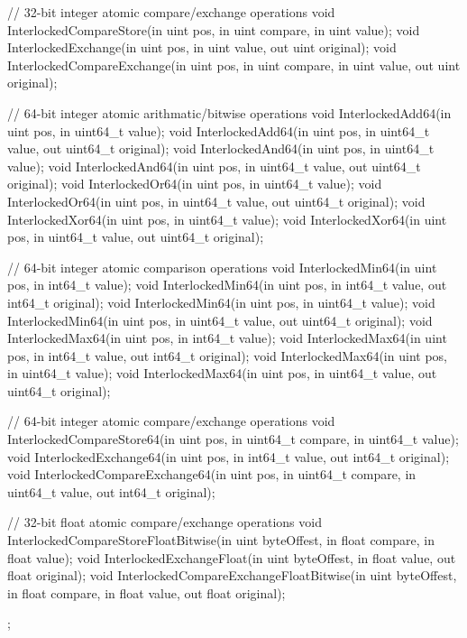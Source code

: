 \begin{HLSL}
{   // 32-bit integer atomic compare/exchange operations
   void InterlockedCompareStore(in uint pos, in uint compare, in uint value);
   void InterlockedExchange(in uint pos, in uint value, out uint original);
   void InterlockedCompareExchange(in uint pos, in uint compare, in uint value,
                                    out uint original);

   // 64-bit integer atomic arithmatic/bitwise operations
   void InterlockedAdd64(in uint pos, in uint64_t value);
   void InterlockedAdd64(in uint pos, in uint64_t value, out uint64_t original);
   void InterlockedAnd64(in uint pos, in uint64_t value);
   void InterlockedAnd64(in uint pos, in uint64_t value, out uint64_t original);
   void InterlockedOr64(in uint pos, in uint64_t value);
   void InterlockedOr64(in uint pos, in uint64_t value, out uint64_t original);
   void InterlockedXor64(in uint pos, in uint64_t value);
   void InterlockedXor64(in uint pos, in uint64_t value, out uint64_t original);

   // 64-bit integer atomic comparison operations
   void InterlockedMin64(in uint pos, in int64_t value);
   void InterlockedMin64(in uint pos, in int64_t value, out int64_t original);
   void InterlockedMin64(in uint pos, in uint64_t value);
   void InterlockedMin64(in uint pos, in uint64_t value, out uint64_t original);
   void InterlockedMax64(in uint pos, in int64_t value);
   void InterlockedMax64(in uint pos, in int64_t value, out int64_t original);
   void InterlockedMax64(in uint pos, in uint64_t value);
   void InterlockedMax64(in uint pos, in uint64_t value, out uint64_t original);

   // 64-bit integer atomic compare/exchange operations
   void InterlockedCompareStore64(in uint pos, in uint64_t compare, in uint64_t value);
   void InterlockedExchange64(in uint pos, in int64_t value, out int64_t original);
   void InterlockedCompareExchange64(in uint pos, in uint64_t compare,
                                      in uint64_t value, out int64_t original);

   // 32-bit float atomic compare/exchange operations
   void InterlockedCompareStoreFloatBitwise(in uint byteOffest,
                                             in float compare, in float value);
   void InterlockedExchangeFloat(in uint byteOffest, in float value,
                                  out float original);
   void InterlockedCompareExchangeFloatBitwise(in uint byteOffest,
                                                in float compare,
                                                in float value,
                                                out float original);
};
\end{HLSL}

